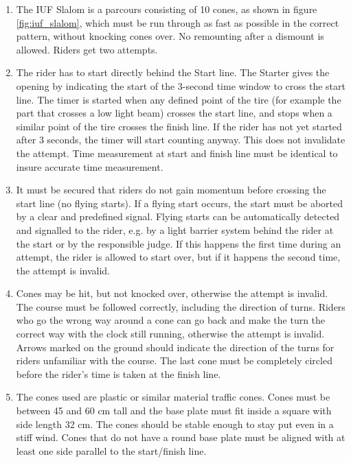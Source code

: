 \begin{enumerate}[leftmargin=1.5em,labelsep=*]
	\item The IUF Slalom is a parcours consisting of 10 cones, as shown in figure \ref{fig:iuf_slalom}, which 
	must be run through as fast as possible in the correct pattern, without knocking cones over.
	No remounting after a dismount is allowed.
	Riders get two attempts.
	
	\item The rider has to start directly behind the Start line.
	The Starter gives the opening by indicating the start of the 3-second time window to cross the start line.
	The timer is started when any defined point of the tire (for example the part that crosses a low light beam) 
  crosses the start line, and stops when a similar point of the tire crosses the finish line.
	If the rider has not yet started after 3 seconds, the timer will start counting anyway.
	This does not invalidate the attempt.
	Time measurement at start and finish line must be identical to insure accurate time measurement.
	
	\item It must be secured that riders do not gain momentum before crossing the start line (no flying starts).
	If a flying start occurs, the start must be aborted by a clear and predefined signal.
	Flying starts can be automatically detected and signalled to the rider, e.g. by a light barrier system 
  behind the rider at the start or by the responsible judge.
	If this happens the first time during an attempt, the rider is allowed to start over, but if it happens the 
  second time, the attempt is invalid.
	
	\item Cones may be hit, but not knocked over, otherwise the attempt is invalid.
	The course must be followed correctly, including the direction of turns.
	Riders who go the wrong way around a cone can go back and make the turn the correct way with the clock 
  still running, otherwise the attempt is invalid.
	Arrows marked on the ground should indicate the direction of the turns for riders unfamiliar with the course.
	The last cone must be completely circled before the rider's time is taken at the finish line.
	
	\item The cones used are plastic or similar material traffic cones.
	Cones must be between 45 and 60 cm tall and the base plate must fit inside a square with side length 32 cm.
	The cones should be stable enough to stay put even in a stiff wind.
	Cones that do not have a round base plate must be aligned with at least one side parallel to the start/finish line.
	

\end{enumerate}
